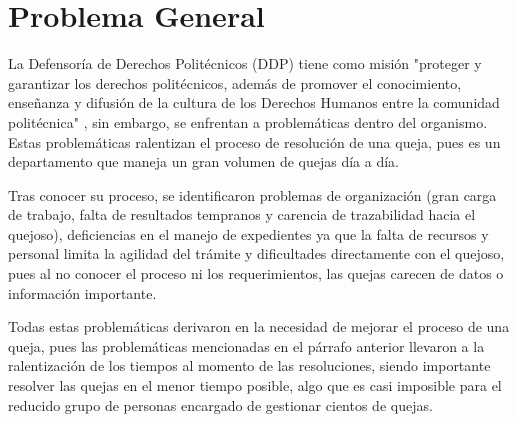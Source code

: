 \section{Problema General}
La Defensoría de Derechos Politécnicos (DDP) tiene como misión "proteger y garantizar los derechos politécnicos, además de promover el conocimiento, enseñanza y difusión de la cultura de los Derechos Humanos entre la comunidad politécnica" \cite{3}, sin embargo, se enfrentan a problemáticas dentro del organismo. Estas problemáticas ralentizan el proceso de resolución de una queja, pues es un departamento que maneja un gran volumen de quejas día a día.

Tras conocer su proceso, se identificaron problemas de organización (gran carga de trabajo, falta de resultados tempranos y carencia de trazabilidad hacia el quejoso), deficiencias en el manejo de expedientes ya que la falta de recursos y personal limita la agilidad del trámite y dificultades directamente con el quejoso, pues al no conocer el proceso ni los requerimientos, las quejas carecen de datos o información importante.

Todas estas problemáticas derivaron en la necesidad de mejorar el proceso de una queja, pues las problemáticas mencionadas en el párrafo anterior llevaron a la ralentización de los tiempos al momento de las resoluciones, siendo importante resolver las quejas en el menor tiempo posible, algo que es casi imposible para el reducido grupo de personas encargado de gestionar cientos de quejas.